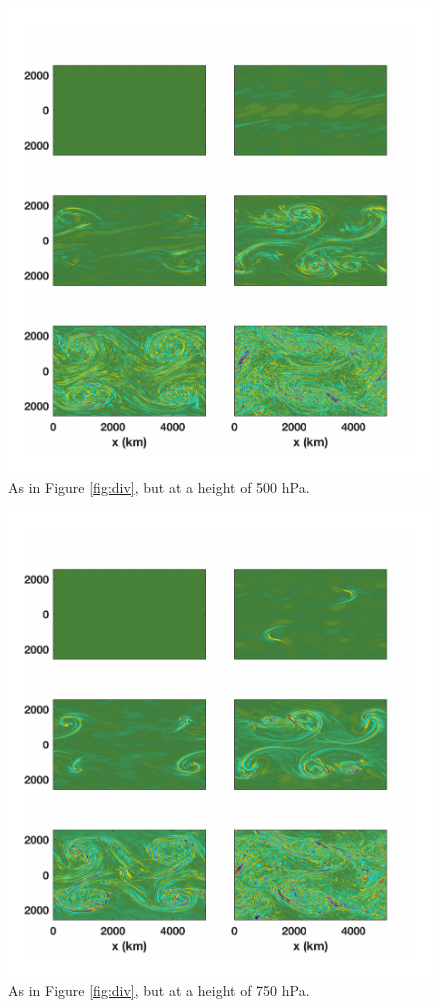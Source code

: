 \begin{figure}[H]
\includegraphics[scale=1]{Chapter3/img/div_height_50}
\caption{As in Figure \ref{fig:div}, but at a height of 500 hPa.}
\label{fig:div_height_25}
\end{figure}

\begin{figure}[H]
\includegraphics[scale=1]{Chapter3/img/div_height_25}
\caption{As in Figure \ref{fig:div}, but at a height of 750 hPa.}
\label{fig:div_height_50}
\end{figure}

